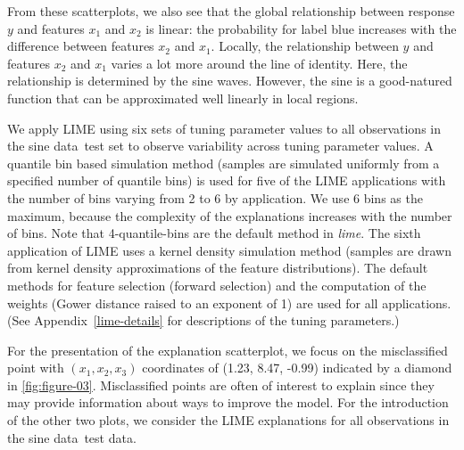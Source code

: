 \documentclass[AMS,STIX2COL]{WileyNJD-v2}\usepackage[]{graphicx}\usepackage[]{color}
\newcommand{\data}{sine data}
\begin{document}
From these scatterplots, we also see that the global relationship between response $y$ and features $x_1$ and $x_2$ is linear: the probability for label blue increases with the difference between features $x_2$ and $x_1$. Locally, the relationship between $y$ and features $x_2$ and $x_1$ varies a lot more around the line of identity. Here, the relationship is determined by the sine waves. However, the sine is a good-natured function that can be approximated well linearly in local regions.

We apply LIME using six sets of tuning parameter values to all observations in the \data \ test set to observe variability across tuning parameter values. A quantile bin based simulation method (samples are simulated uniformly from a specified number of quantile bins) is used for five of the LIME applications with the number of bins varying from 2 to 6 by application. We use 6 bins as the maximum, because the complexity of the explanations increases with the number of bins. Note that 4-quantile-bins are the default method in \emph{lime}. The sixth application of LIME uses a kernel density simulation method (samples are drawn from kernel density approximations of the feature distributions). The default methods for feature selection (forward selection) and the computation of the weights (Gower distance raised to an exponent of 1) are used for all applications. (See Appendix~\ref{lime-details} for descriptions of the tuning parameters.)

For the presentation of the explanation scatterplot, we focus on the misclassified point with $(x_1, x_2, x_3)$ coordinates of (1.23, 8.47, -0.99) indicated by a diamond in \autoref{fig:figure-03}. Misclassified points are often of interest to explain since they may provide information about ways to improve the model. For the introduction of the other two  plots, we consider the LIME explanations for  all observations in the \data \ test data.
\end{document}
